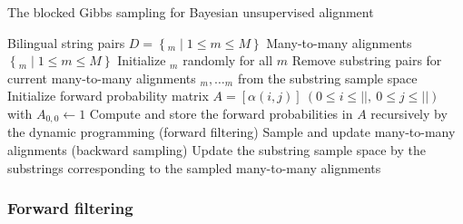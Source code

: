 \documentclass[english]{jnlp_1.4}
\def\pair#1#2{}
\newcommand{\svec}[1]{}
\begin{document}
\begin{algorithm}[tb]
\caption{The blocked Gibbs sampling for Bayesian unsupervised alignment}
\label{alg:sampling}
\begin{algorithmic}[1]
\REQUIRE Bilingual string pairs $D = \left\{ \pair{\svec{s}}{\svec{t}}_m \mid 1 \leq m \leq M\right\}$
\ENSURE  Many-to-many alignments $\left\{ \svec{a}_m \mid 1 \leq m \leq M \right\}$
\STATE Initialize $\svec{a}_m$ randomly for all $m$
\REPEAT
{}
\STATE Remove substring pairs for current many-to-many alignments $\pair{\svec{\sigma}_{1}}{\svec{\tau}_{1}}_m, \ldots \pair{\svec{\sigma}_{K(\svec{a}_m)}}{\svec{\tau}_{K(\svec{a}_m)}}_m$ from the substring sample space
\STATE Initialize forward probability matrix $A = \left[ \alpha \left( i, j \right) \right] \ (0 \leq i \leq |\svec{s}|, \ 0 \leq j \leq |\svec{t}|)$ with $A_{0,0} \leftarrow 1$
\STATE Compute and store the forward probabilities in $A$ recursively by the dynamic programming (forward filtering)
\STATE Sample and update many-to-many alignments (backward sampling)
\STATE Update the substring sample space by the substrings corresponding to the sampled many-to-many alignments
\ENDFOR
{}
\end{algorithmic}
\end{algorithm}


\subsubsection{Forward filtering}
\end{document}
